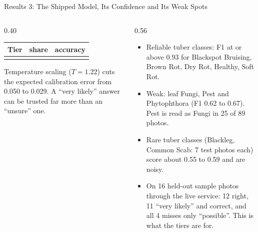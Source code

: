 \documentclass[11pt, aspectratio=169]{beamer}
\begin{document}
\begin{frame}[t]{Results 3: The Shipped Model, Its Confidence and Its Weak Spots}
  \body
  \begin{columns}[T]
    \begin{column}{0.40\textwidth}
      \par\vspace{0.25em}
      \bodys
      \begin{tabular}{@{}lrr@{}}\toprule Tier & share & accuracy \\\midrule
         \\\bottomrule
      \end{tabular}\par\vspace{0.4em}
      \body
      Temperature scaling ($T=1.22$) cuts the expected calibration error from 0.050 to 0.029. A ``very likely'' answer can be trusted far more than an ``unsure'' one.
    \end{column}
    \begin{column}{0.56\textwidth}
      \par\vspace{0.25em}
      \begin{itemize}\setlength\itemsep{0.2em}
        \item Reliable tuber classes: F1 at or above 0.93 for Blackspot Bruising, Brown Rot, Dry Rot, Healthy, Soft Rot.
        \item Weak: leaf Fungi, Pest and Phytophthora (F1 0.62 to 0.67). Pest is read as Fungi in 25 of 89 photos.
        \item Rare tuber classes (Blackleg, Common Scab: 7 test photos each) score about 0.55 to 0.59 and are noisy.
        \item On 16 held-out sample photos through the live service: 12 right, 11 ``very likely'' and correct, and all 4 misses only ``possible''. This is what the tiers are for.
      \end{itemize}
    \end{column}
  \end{columns}
\end{frame}

\end{document}

